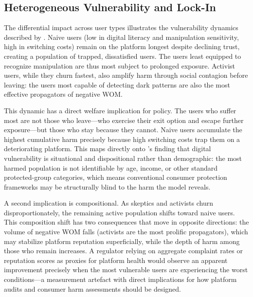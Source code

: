 \documentclass[a4paper,fleqn]{cas-sc}
\begin{document}
\subsection{Heterogeneous Vulnerability and Lock-In}
The differential impact across user types illustrates the vulnerability dynamics described by \citet{rossi2024}. Naive users (low in digital literacy and manipulation sensitivity, high in switching costs) remain on the platform longest despite declining trust, creating a population of trapped, dissatisfied users. The users least equipped to recognize manipulation are thus most subject to prolonged exposure. Activist users, while they churn fastest, also amplify harm through social contagion before leaving: the users most capable of detecting dark patterns are also the most effective propagators of negative WOM.

This dynamic has a direct welfare implication for policy. The users who suffer most are not those who leave---who exercise their exit option and escape further exposure---but those who stay because they cannot. Naive users accumulate the highest cumulative harm precisely because high switching costs trap them on a deteriorating platform. This maps directly onto \citet{rossi2024}'s finding that digital vulnerability is situational and dispositional rather than demographic: the most harmed population is not identifiable by age, income, or other standard protected-group categories, which means conventional consumer protection frameworks may be structurally blind to the harm the model reveals.

A second implication is compositional. As skeptics and activists churn disproportionately, the remaining active population shifts toward naive users. This composition shift has two consequences that move in opposite directions: the volume of negative WOM falls (activists are the most prolific propagators), which may stabilize platform reputation superficially, while the depth of harm among those who remain increases. A regulator relying on aggregate complaint rates or reputation scores as proxies for platform health would observe an apparent improvement precisely when the most vulnerable users are experiencing the worst conditions---a measurement artefact with direct implications for how platform audits and consumer harm assessments should be designed.
\end{document}
